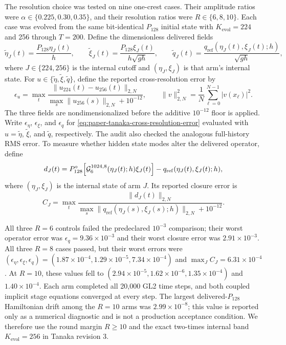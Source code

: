 The resolution choice was tested on nine one-crest cases.  Their amplitude
ratios were $\alpha\in\{0.225,0.30,0.35\}$, and their resolution ratios were
$R\in\{6,8,10\}$.  Each case was evolved from the same bit-identical
$P_{128}$ initial state with
$K_{\mathrm{evol}}=224$ and 256 through $T=200$.  Define the dimensionless
delivered fields
\begin{equation}
  \widetilde\eta_J(t)=\frac{P_{128}\eta_J(t)}{h},\qquad
  \widetilde\xi_J(t)=\frac{P_{128}\xi_J(t)}{h\sqrt{gh}},\qquad
  \widetilde q_J(t)
  =\frac{q_{\mathrm{ref}}(\eta_J(t),\xi_J(t);h)}{\sqrt{gh}},
  \label{eq:paper-tanaka-dimensionless-comparison-fields}
\end{equation}
where $J\in\{224,256\}$ is the internal cutoff and
$(\eta_J,\xi_J)$ is that arm's internal state.  For
$u\in\{\widetilde\eta,\widetilde\xi,\widetilde q\}$, define the reported
cross-resolution error by
\begin{equation}
  \epsilon_u
  =\max_t
  \frac{\lVert u_{224}(t)-u_{256}(t)\rVert_{2,N}}
       {\max_s\lVert u_{256}(s)\rVert_{2,N}+10^{-12}},
  \qquad
  \lVert v\rVert_{2,N}^2
  =\frac{1}{N}\sum_{\ell=0}^{N-1}|v(x_\ell)|^2.
  \label{eq:paper-tanaka-cross-resolution-error}
\end{equation}
The three fields are nondimensionalized before the additive $10^{-12}$ floor
is applied.  Write $\epsilon_\eta$, $\epsilon_\xi$, and $\epsilon_q$ for
\cref{eq:paper-tanaka-cross-resolution-error} evaluated with
$u=\widetilde\eta$, $\widetilde\xi$, and $\widetilde q$, respectively.  The
audit also checked the analogous full-history RMS error.  To measure whether
hidden state modes alter the delivered operator, define
\begin{equation}
  d_J(t)
  =P_{128}^\circ\!\left[
    \mathcal{G}_6^{1024,8}(\eta_J(t);h)\xi_J(t)
  \right]
  -q_{\mathrm{ref}}(\eta_J(t),\xi_J(t);h),
  \label{eq:paper-tanaka-hidden-band-defect}
\end{equation}
where $(\eta_J,\xi_J)$ is the internal state of arm $J$.  Its reported closure
error is
\begin{equation}
  C_J
  =\max_t
  \frac{\lVert d_J(t)\rVert_{2,N}}
       {\max_s\lVert q_{\mathrm{ref}}(\eta_J(s),\xi_J(s);h)\rVert_{2,N}
        +10^{-12}}.
  \label{eq:paper-tanaka-hidden-band-closure}
\end{equation}

All three $R=6$ controls failed the predeclared $10^{-3}$ comparison; their
worst operator error was $\epsilon_q=9.36\times10^{-3}$ and
their worst closure error was $2.91\times10^{-3}$.  All three $R=8$ cases
passed, but their worst errors were
$(\epsilon_\eta,\epsilon_\xi,\epsilon_q)
=(1.87\times10^{-4},1.29\times10^{-5},7.34\times10^{-4})$ and
$\max_J C_J=6.31\times10^{-4}$.  At $R=10$, these values fell to
$(2.94\times10^{-5},1.62\times10^{-6},1.35\times10^{-4})$ and
$1.40\times10^{-4}$.  Each arm completed all 20,000 GL2 time steps, and both
coupled implicit stage equations converged at every step.  The largest
delivered-$P_{128}$ Hamiltonian drift among the $R=10$
arms was $2.99\times10^{-8}$; this value is reported only as a numerical
diagnostic and is not a production acceptance condition.  We therefore use
the round margin $R\geq10$ and the exact two-times internal band
$K_{\mathrm{evol}}=256$ in Tanaka revision 3.

